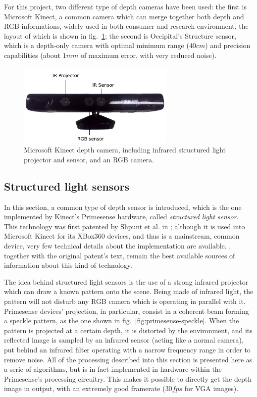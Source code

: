 For this project, two different type of depth cameras have been used: the first
is Microsoft Kinect, a common camera which can merge together both depth and RGB
informations, widely used in both consumer and research environment,
the layout of which is shown in fig.~\ref{fig:kinect}; the second is Occipital's
Structure sensor, which is a depth-only camera with optimal minimum range
($40\unit{cm}$) and precision capabilities (about $1\unit{mm}$ of maximum error,
with very reduced noise).

\begin{figure}[htbp]
\centering
\includegraphics[width=3in]{./Graphics/kinect}
\caption{Microsoft Kinect depth camera, including infrared structured light
projector and sensor, and an RGB camera.\label{fig:kinect}}
\end{figure}

\subsection{Structured light sensors}
In this section, a common type of depth sensor is introduced, which is the one
implemented by Kinect's Primesense hardware, called \emph{structured light
sensor}. This technology was first patented by Shpunt et al. in
\cite{primesense-patent}; although it is used into Microsoft Kinect for its
XBox360 devices, and thus is a mainstream, common device, very few technical
details about the implementation are available. \cite{how-kinect-work}, together
with the original patent's text, remain the best available sources of
information about this kind of technology.

The idea behind structured light sensors is the use of a strong infrared projector
which can draw a known pattern onto the scene. Being made of infrared light,
the pattern will not disturb any RGB camera which is operating in parallel with
it. Primesense devices' projection, in particular, consist in a coherent beam
forming a speckle pattern, as the one shown
in fig.~\ref{fig:primesense-speckle}. When the pattern is projected at a certain
depth, it is distorted by the environment, and its reflected image is sampled
by an infrared sensor (acting like a normal camera), put behind an infrared
filter operating with a narrow frequency range in order to remove noise. All of
the processing described into this section is presented here as a serie of
algorithms, but is in fact implemented in hardware within the Primesense's
processing circuitry. This makes it possible to directly get the depth image in
output, with an extremely good framerate ($30\unit{fps}$ for VGA images).

